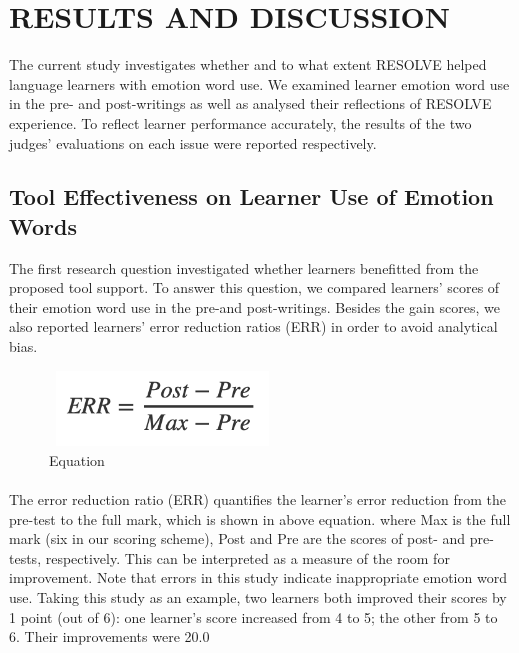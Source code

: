 \documentclass[a4paper,12pt,oneside]{article}
\begin{document}
\newpage
\section{RESULTS AND DISCUSSION}
The current study investigates whether and to what extent RESOLVE helped language learners with emotion word use. We examined learner emotion word use in the pre- and post-writings as well as analysed their reflections of RESOLVE experience. To reflect learner performance accurately, the results of the two judges’ evaluations on each issue were reported respectively. 
\subsection{Tool Effectiveness on Learner Use of Emotion Words}
The first research question investigated whether learners benefitted from the proposed tool support. To answer this question, we compared learners’ scores of their emotion word use in the pre-and post-writings. Besides the gain scores, we also reported learners’ error reduction ratios (ERR) in order to avoid analytical bias. 

\begin{figure}[H]
\includegraphics[height=2cm,width=6cm]{Equation.png}
\centering
\caption{Equation}
\end{figure}

\paragraph{}
The error reduction ratio (ERR) quantifies the learner’s error reduction from the pre-test to the full mark, which is shown in above equation. where Max is the full mark (six in our scoring scheme), Post and Pre are the scores of post- and pre-tests, respectively. This can be interpreted as a measure of the room for improvement. Note that errors in this study indicate inappropriate emotion word use. Taking this study as an example, two learners both improved their scores by 1 point (out of 6): one learner’s score increased from 4 to 5; the other from 5 to 6. Their improvements were 20.0%
\end{document}
